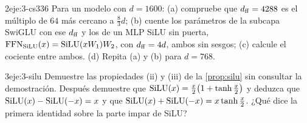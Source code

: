 \begin{ejercicio}{2}{eje:3-cs336}
Para un modelo con $d=1600$: (a) compruebe que $d_{\mathrm{ff}}=4288$ es el múltiplo de $64$ más cercano a $\frac83 d$; (b) cuente los parámetros de la subcapa SwiGLU con ese $d_{\mathrm{ff}}$ y los de un MLP SiLU sin puerta, $\operatorname{FFN}_{\operatorname{SiLU}}(x)=\operatorname{SiLU}(xW_1)W_2$, con $d_{\mathrm{ff}}=4d$, ambos sin sesgos; (c) calcule el cociente entre ambos. (d) Repita (a) y (b) para $d=768$.
\end{ejercicio}

\begin{ejercicio}{3}{eje:3-silu}
Demuestre las propiedades (ii) y (iii) de la \cref{prop:silu} sin consultar la demostración. Después demuestre que $\operatorname{SiLU}(x)=\frac{x}{2}\bigl(1+\tanh\frac{x}{2}\bigr)$ y deduzca que $\operatorname{SiLU}(x)-\operatorname{SiLU}(-x)=x$ y que $\operatorname{SiLU}(x)+\operatorname{SiLU}(-x)=x\tanh\frac{x}{2}$. ¿Qué dice la primera identidad sobre la parte impar de SiLU?
\end{ejercicio}
